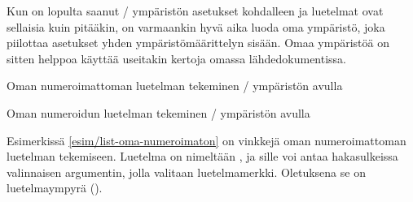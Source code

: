 Kun on lopulta saanut \-/ ympäristön asetukset
kohdalleen ja luetelmat ovat sellaisia kuin pitääkin, on varmaankin hyvä
aika luoda oma ympäristö, joka piilottaa asetukset yhden
ympäristömäärittelyn sisään. Omaa ympäristöä on sitten helppoa käyttää
useitakin kertoja omassa lähdedokumentissa.

\begin{esimerkki*}

\begin{koodilohko}
\newenvironment{numeroimaton}[1][\textbullet]{%
  \begin{list}{#1}{
      \setlength{\leftmargin}{1.1em}
      \setlength{\labelsep}{.2em}
      \setlength{\itemsep}{.4ex plus .1ex}
      \setlength{\parsep}{.2ex}
    }
  }{\end{list}}
\end{koodilohko}
  \caption{Oman numeroimattoman luetelman tekeminen \-/
    ympäristön avulla}
  \label{esim/list-oma-numeroimaton}
\end{esimerkki*}

\begin{esimerkki*}

\begin{koodilohko}
\newenvironment{numeroitu}[1][0]{%
  \begin{list}{\arabic{enumi}.}{
      \usecounter{enumi}
      \setcounter{enumi}{#1}
      \renewcommand{\makelabel}[1]{\hfill\bfseries\large ##1}
      \setlength{\leftmargin}{2em}
      \setlength{\labelsep}{.5em}
      \setlength{\itemsep}{.4ex plus .1ex}
      \setlength{\parsep}{.2ex}
    }
  }{\end{list}}
\end{koodilohko}
  \caption{Oman numeroidun luetelman tekeminen \-/
    ympäristön avulla}
  \label{esim/list-oma-numeroitu}
\end{esimerkki*}

Esimerkissä \ref{esim/list-oma-numeroimaton} on vinkkejä oman
numeroimattoman luetelman tekemiseen. Luetelma on nimeltään
, ja sille voi antaa hakasulkeissa valinnaisen
argumentin, jolla valitaan luetelmamerkki. Oletuksena se on
luetelmaympyrä ().


